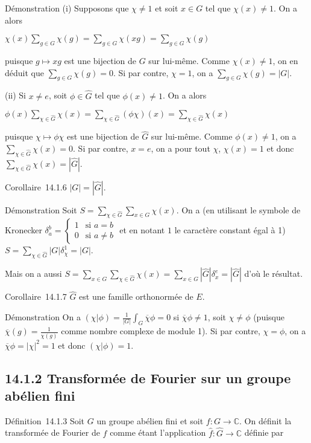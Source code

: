 Démonstration (i) Supposons que $\chi \neq 1$ et soit $x
\in G$ tel que $\chi(x) \neq 1$. On a alors

$\chi(x) \sum_{g \in G} \chi(g) =
\sum_{g \in G} \chi(xg) =
\sum_{g \in G} \chi(g)$

puisque $g \mapsto xg$ est une bijection de $G$ sur lui-même. Comme $\chi(x) \neq 1$, on en déduit que
$\sum_{g \in G} \chi(g) = 0$. Si par contre, $\chi = 1$, on a
$\sum_{g \in G} \chi(g) = |G|$.

(ii) Si $x \neq e$, soit $\phi \in \hat{G}$ tel que $\phi(x) \neq 1$. On a alors

$\phi(x) \sum_{\chi \in \hat{G}} \chi(x)
= \sum_{\chi \in \hat{G}}(\phi\chi)(x) =
\sum_{\chi \in \hat{G}} \chi(x)$

puisque $\chi \mapsto \phi\chi$ est une bijection de
$\hat{G}$ sur lui-même. Comme
$\phi(x) \neq 1$, on a
$\sum_{\chi \in \hat{G}} \chi(x) = 0$. Si par contre, $x = e$, on a
pour tout $\chi$, $\chi(x) = 1$ et donc
$\sum_{\chi \in \hat{G}} \chi(x) = |\hat{G}|$.

Corollaire~14.1.6 $|G| = |\hat{G}|$.

Démonstration Soit $S = \sum_{\chi \in \hat{G}} \sum_{x \in G} \chi(x)$. On a (en utilisant le
symbole de Kronecker $\delta_a^b = \begin{cases}
1 & \text{si } a = b \\
0 & \text{si } a \neq b
\end{cases}$ et en notant $1$ le caractère constant égal à 1) 
$S = \sum_{\chi \in \hat{G}} |G| \delta_\chi^1 = |G|$. 

Mais on a aussi $S = \sum_{x \in G} \sum_{\chi \in \hat{G}} \chi(x)
= \sum_{x \in G} |\hat{G}| \delta_x^e
= |\hat{G}|$ d'où le résultat.

Corollaire~14.1.7 $\hat{G}$ est une famille orthonormée
de $E$.

Démonstration On a $(\chi | \phi) = \frac{1}{|G|} \int_G \overline{\chi}\phi = 0$ si
$\overline{\chi}\phi \neq 1$, soit
$\chi \neq \phi$ (puisque $\overline{\chi}(g) = \frac{1}{\chi(g)}$ comme nombre complexe de module 1). Si
par contre, $\chi = \phi$, on a $\overline{\chi}\phi =
|\chi|^2 = 1$ et donc
$(\chi|\phi) = 1$.

\subsection{14.1.2 Transformée de Fourier sur un groupe abélien fini}

Définition~14.1.3 Soit $G$ un groupe abélien fini et soit $f : G \rightarrow \mathbb{C}$. On
définit la transformée de Fourier de $f$ comme étant l'application
$\hat{f} : \hat{G} \rightarrow \mathbb{C}$ définie par

